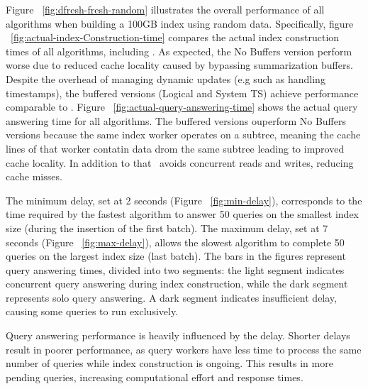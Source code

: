 Figure ~\ref{fig:dfresh-fresh-random} illustrates the overall performance of all 
algorithms when building a 100GB index using random data. Specifically,
figure ~\ref{fig:actual-index-Construction-time} compares the actual index construction times 
of all algorithms, including \Fresh. As expected, the No Buffers version 
perform worse due to reduced cache locality caused by bypassing summarization buffers.
Despite the overhead of managing dynamic updates (e.g such as handling timestamps), 
the buffered versions (Logical and System TS) achieve performance comparable to \Fresh. 
Figure ~\ref{fig:actual-query-answering-time} shows the 
actual query answering time for all algorithms. The buffered versions ouperform No Buffers versions 
because the same index worker operates on a subtree, meaning the cache lines of that worker 
contatin data drom the same subtree leading to improved cache locality. In addition to that
\Fresh\ avoids concurrent reads and writes, reducing cache misses.



The minimum delay, set at 2 seconds (Figure ~\ref{fig:min-delay}), corresponds to the 
time required by the fastest algorithm to answer 50 queries on the smallest index size 
(during the insertion of the first batch). The maximum delay, set at 7 seconds
(Figure ~\ref{fig:max-delay}), allows the slowest algorithm to complete 50 queries on the
largest index size (last batch). The bars in the figures represent query answering times,
divided into two segments: the light segment indicates concurrent query answering
during index construction, while the dark segment represents solo query answering.
A dark segment indicates insufficient delay, causing some queries to run exclusively.

Query answering performance is heavily influenced by the delay. Shorter delays result
in poorer performance, as query workers have less time to process the same number
of queries while index construction is ongoing. This results in more pending queries,
increasing computational effort and response times.




